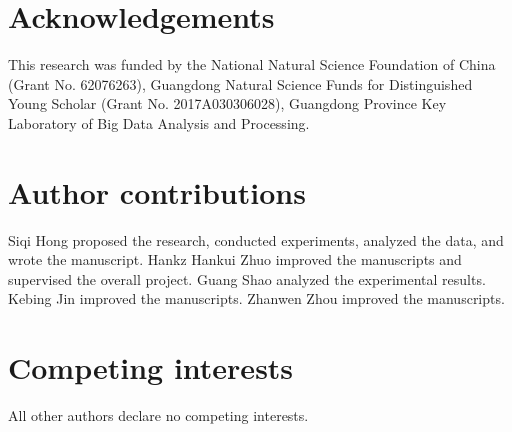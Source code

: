 \documentclass[sn-mathphys,Numbered]{sn-jnl}
\begin{document}
\section{Acknowledgements}

This research was funded by the National Natural Science Foundation of China (Grant No. 62076263), Guangdong Natural Science Funds for Distinguished Young Scholar (Grant No. 2017A030306028), Guangdong Province Key Laboratory of Big Data Analysis and Processing. 



\section{Author contributions}
Siqi Hong proposed the research, conducted experiments, analyzed the data, and wrote the manuscript. 
Hankz Hankui Zhuo improved the manuscripts and supervised the overall project.
Guang Shao analyzed the experimental results.
Kebing Jin improved the manuscripts.
Zhanwen Zhou improved the manuscripts.

\section{Competing interests}
All other authors declare no competing interests.
\end{document}
